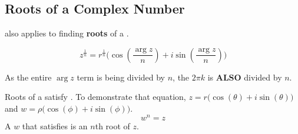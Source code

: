 \subsection{Roots of a Complex Number}\label{subsec:Complex_Roots}
 also applies to finding \textbf{roots} of a .

\begin{equation}\label{eq:Complex_Roots}
  z^{\frac{1}{n}} = r^{\frac{1}{n}} \biggl( \cos \left( \frac{\arg{z}}{n} \right) + i \sin \left( \frac{\arg{z}}{n} \right) \biggr)
\end{equation}

\begin{remark*}
  As the entire $\arg{z}$ term is being divided by $n$, the $2 \pi k$ is \textbf{ALSO} divided by $n$.
\end{remark*}

Roots of a  satisfy .
To demonstrate that equation, $z = r \bigl( \cos(\theta) + i \sin(\theta) \bigr)$ and $w = \rho \bigl( \cos(\phi) + i \sin(\phi) \bigr)$.
\begin{equation}\label{eq:Complex_Root_Requirement}
  w^{n} = z
\end{equation}
A $w$ that satisfies  is an $n$th root of $z$.

